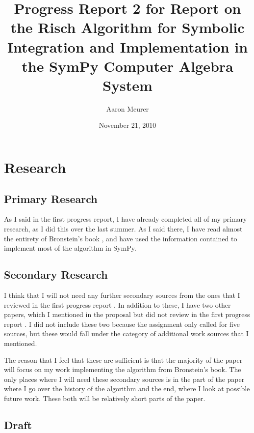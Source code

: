 \documentclass[12pt]{article}
\begin{document}
\title{Progress Report 2 for Report on the Risch Algorithm for Symbolic
Integration and Implementation in the Sym\-Py Computer Algebra System}
\author{Aaron Meurer}
\date{November 21, 2010}
\maketitle


\section{Research}
\subsection{Primary Research}
As I said in the first progress report, I have already completed all of
my primary research, as I did this over the last summer.  As I said
there, I have read almost the entirety of Bronstein's book
\cite{bronstein2005symbolic}, and have used the information contained to
implement most of the algorithm in Sym\-Py.

\subsection{Secondary Research}
I think that I will not need any further secondary sources from the ones
that I reviewed in the first progress report
\cite{bronstein1989simplification, davenport1984integration,
kauers2008integration, moses1971symbolic, risch1969problem}.  In
addition to these, I have two other papers, which I mentioned in the
proposal but did not review in the first progress report
\cite{roach1997meijerg, adamchik1990hypergeometric}.  I did not include
these two because the assignment only called for five sources, but these
would fall under the category of additional work sources that I
mentioned.

The reason that I feel that these are sufficient is that the majority of
the paper will focus on my work implementing the algorithm from
Bronstein's book.  The only places where I will need these secondary
sources is in the part of the paper where I go over the history of the
algorithm and the end, where I look at possible future work.  These both
will be relatively short parts of the paper.

\subsection{Draft}



\end{document}
